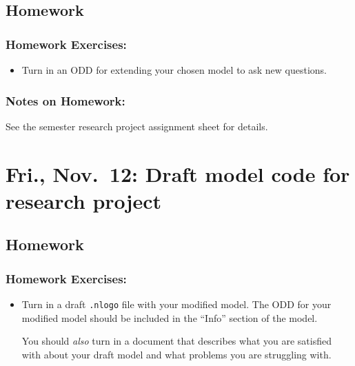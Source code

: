 \documentclass[
]{article}
\providecommand{\tightlist}{%
  \setlength{\itemsep}{0pt}\setlength{\parskip}{0pt}}
\begin{document}
\hypertarget{homework-13}{%
\subsection{Homework}\label{homework-13}}

\hypertarget{homework-exercises-13}{%
\subsubsection{Homework Exercises:}\label{homework-exercises-13}}

\begin{itemize}
\tightlist
\item
  Turn in an ODD for extending your chosen model to ask new questions.
\end{itemize}

\hypertarget{notes-on-homework-9}{%
\subsubsection{Notes on Homework:}\label{notes-on-homework-9}}

See the semester research project assignment sheet for details.

\hypertarget{fri.-nov.-12-draft-model-code-for-research-project}{%
\section{Fri., Nov.~12: Draft model code for research
project}\label{fri.-nov.-12-draft-model-code-for-research-project}}

\hypertarget{homework-14}{%
\subsection{Homework}\label{homework-14}}

\hypertarget{homework-exercises-14}{%
\subsubsection{Homework Exercises:}\label{homework-exercises-14}}

\begin{itemize}
\item
  Turn in a draft \texttt{.nlogo} file with your modified model. The ODD
  for your modified model should be included in the ``Info'' section of
  the model.

  You should \emph{also} turn in a document that describes what you are
  satisfied with about your draft model and what problems you are
  struggling with.
\end{itemize}
\end{document}
